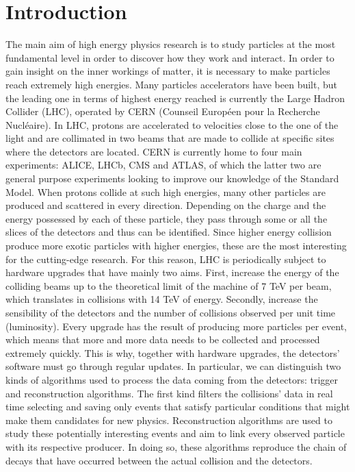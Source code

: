 \documentclass[12pt,a4paper]{report}
\begin{document}
\tableofcontents


\chapter*{Introduction}

The main aim of high energy physics research is to study particles at the most fundamental level in order to discover how they work and interact. In order to gain insight on the inner workings of matter, it is necessary to make particles reach extremely high energies. Many particles accelerators have been built, but the leading one in terms of highest energy reached is currently the Large Hadron Collider (LHC), operated by CERN (Counseil Européen pour la Recherche Nucléaire). In LHC, protons are accelerated to velocities close to the one of the light and are collimated in two beams that are made to collide at specific sites where the detectors are located. CERN is currently home to four main experiments: ALICE, LHCb, CMS and ATLAS, of which the latter two are general purpose experiments looking to improve our knowledge of the Standard Model. When protons collide at such high energies, many other particles are produced and scattered in every direction. Depending on the charge and the energy possessed by each of these particle, they pass through some or all the slices of the detectors and thus can be identified. Since higher energy collision produce more exotic particles with higher energies, these are the most interesting for the cutting-edge research. For this reason, LHC is periodically subject to hardware upgrades that have mainly two aims. First, increase the energy of the colliding beams up to the theoretical limit of the machine of 7 TeV per beam, which translates in collisions with 14 TeV of energy. Secondly, increase the sensibility of the detectors and the number of collisions observed per unit time (luminosity). Every upgrade has the result of producing more particles per event, which means that more and more data needs to be collected and processed extremely quickly. This is why, together with hardware upgrades, the detectors' software must go through regular updates. In particular, we can distinguish two kinds of algorithms used to process the data coming from the detectors: trigger and reconstruction algorithms. The first kind filters the collisions' data in real time selecting and saving only events that satisfy particular conditions that might make them candidates for new physics. Reconstruction algorithms are used to study these potentially interesting events and aim to link every observed particle with its respective producer. In doing so, these algorithms reproduce the chain of decays that have occurred between the actual collision and the detectors. \newline
\end{document}
